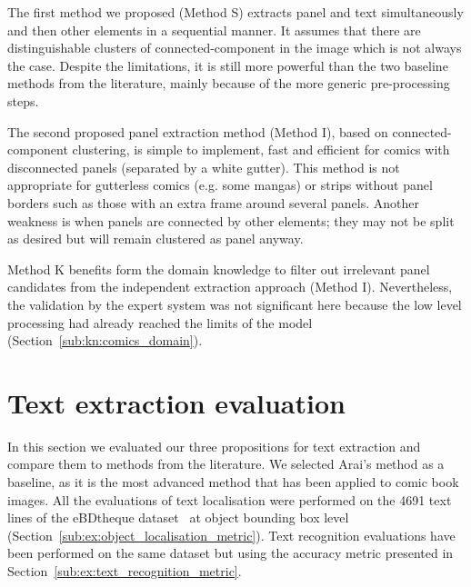 The first method we proposed (Method S) extracts panel and text simultaneously and then other elements in a sequential manner.
It assumes that there are distinguishable clusters of connected-component in the image which is not always the case.
Despite the limitations, it is still more powerful than the two baseline methods from the literature, mainly because of the more generic pre-processing steps.

The second proposed panel extraction method (Method I), based on connected-component clustering, is simple to implement, fast and efficient for comics with disconnected panels (separated by a white gutter).
This method is not appropriate for gutterless comics (e.g. some mangas) or strips without panel borders such as those with an extra frame around several panels.
Another weakness is when panels are connected by other elements; they may not be split as desired but will remain clustered as panel anyway.

Method K benefits form the domain knowledge to filter out irrelevant panel candidates from the independent extraction approach (Method I).
Nevertheless, the validation by the expert system was not significant here because the low level processing had already reached the limits of the model (Section~\ref{sub:kn:comics_domain}).






\section{Text extraction evaluation} %
\label{sub:ex:text_extraction_recognition_evaluation}

In this section we evaluated our three propositions for text extraction and compare them to methods from the literature.
We selected Arai's method as a baseline, as it is the most advanced method that has been applied to comic book images.
All the evaluations of text localisation were performed on the 4691 text lines of the eBDtheque dataset~\cite{Guerin2013} at object bounding box level (Section~\ref{sub:ex:object_localisation_metric}).
Text recognition evaluations have been performed on the same dataset but using the accuracy metric presented in Section~\ref{sub:ex:text_recognition_metric}.


